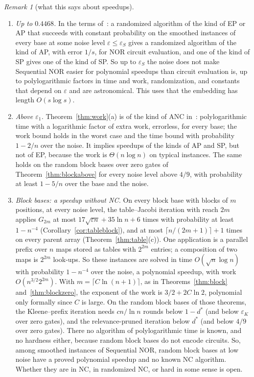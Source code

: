\documentclass[11pt]{amsart}
\theoremstyle{definition}
\theoremstyle{remark}
\newtheorem{remark}[theorem]{Remark}
\newcommand{\eps}{\varepsilon}
\begin{document}
\begin{remark}[what this says about speedups]\label{rem:speedup}
\begin{enumerate}[label=(\roman*),leftmargin=2.4em]
\item \emph{Up to $0.4468$.} In the terms of~\cite{krs}: a randomized algorithm of the kind of EP or
AP that succeeds with constant probability on the smoothed instances of every base at some noise
level $\eps\le\eps_S$ gives a randomized algorithm of the kind of AP, with error $1/s$, for NOR circuit
evaluation, and one of the kind of SP gives one of the kind of SP. So up to $\eps_S$ the noise does
not make Sequential NOR easier for polynomial speedups than circuit evaluation is, up to
polylogarithmic factors in time and work, randomization, and constants that depend on $\eps$ and
are astronomical. This uses that the embedding has length $O(s\log s)$.
\item \emph{Above $\eps_1$.} Theorem~\ref{thm:work}(a) is of the kind of ANC in~\cite{krs}:
polylogarithmic time with a logarithmic factor of extra work, errorless, for every base; the work
bound holds in the worst case and the time bound with probability $1-2/n$ over the noise. It
implies speedups of the kinds of AP and SP, but not of EP, because the work is $\Theta(n\log n)$
on typical instances. The same holds on the random block bases over zero gates of
Theorem~\ref{thm:blockabove} for every noise level above $4/9$, with probability at least $1-5/n$
over the base and the noise.
\item \emph{Block bases: a speedup without NC.} On every block base with blocks of $m$ positions,
at every noise level, the table--Jacobi iteration with reach $2m$ applies $G_{2m}$ at most
$17\sqrt{\eps n}+35\ln n+6$ times with probability at least $1-n^{-4}$
(Corollary~\ref{cor:tableblock}), and at most $\lceil n/(2m+1)\rceil+1$ times on every parent array
(Theorem~\ref{thm:table}(c)). One application is a parallel prefix over $n$ maps stored as tables
with $2^{2m}$ entries; a composition of two maps is $2^{2m}$ look-ups. So these instances are
solved in time $O(\sqrt n\log n)$ with probability $1-n^{-4}$ over the noise, a polynomial speedup,
with work $O(n^{3/2}2^{2m})$. With $m=\lceil C\ln(n+1)\rceil$, as in Theorems~\ref{thm:block}
and~\ref{thm:blockzero}, the exponent of the work is $3/2+2C\ln2$, polynomial only formally since
$C$ is large. On the random block bases of those theorems, the Kleene--prefix iteration needs
$cn/\ln n$ rounds below $1-d^*$ (and below $\eps_K$ over zero gates), and the relevance-pruned
iteration below $d^*$ (and below $4/9$ over zero gates). There no algorithm of polylogarithmic
time is known, and no hardness either, because random block bases do not encode circuits. So,
among smoothed instances of Sequential NOR, random block bases at low noise have a proved
polynomial speedup and no known NC algorithm. Whether they are in NC, in randomized NC, or hard in
some sense is open.
\end{enumerate}
\end{remark}
\end{document}
